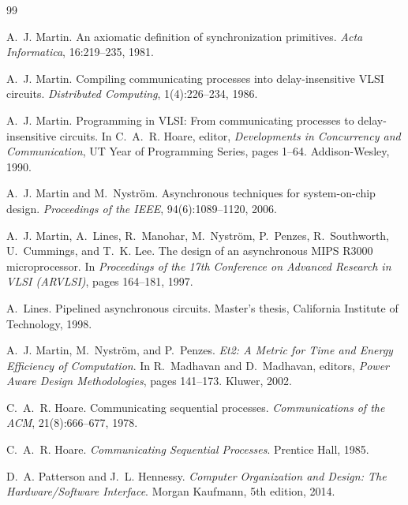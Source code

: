 \documentclass[11pt]{article}
\begin{document}
\begin{thebibliography}{99}

A.~J. Martin.
\newblock An axiomatic definition of synchronization primitives.
\newblock \emph{Acta Informatica}, 16:219--235, 1981.

A.~J. Martin.
\newblock Compiling communicating processes into delay-insensitive VLSI circuits.
\newblock \emph{Distributed Computing}, 1(4):226--234, 1986.

A.~J. Martin.
\newblock Programming in VLSI: From communicating processes to delay-insensitive
  circuits.
\newblock In C.~A.~R. Hoare, editor, \emph{Developments in Concurrency and
  Communication}, UT Year of Programming Series, pages 1--64. Addison-Wesley,
  1990.

A.~J. Martin and M.~Nystr\"om.
\newblock Asynchronous techniques for system-on-chip design.
\newblock \emph{Proceedings of the IEEE}, 94(6):1089--1120, 2006.

A.~J. Martin, A.~Lines, R.~Manohar, M.~Nystr\"om, P.~Penzes, R.~Southworth,
  U.~Cummings, and T.~K. Lee.
\newblock The design of an asynchronous MIPS R3000 microprocessor.
\newblock In \emph{Proceedings of the 17th Conference on Advanced Research in
  VLSI (ARVLSI)}, pages 164--181, 1997.

A.~Lines.
\newblock Pipelined asynchronous circuits.
\newblock Master's thesis, California Institute of Technology, 1998.

A.~J. Martin, M.~Nystr\"om, and P.~Penzes.
\newblock \emph{Et2: A Metric for Time and Energy Efficiency of Computation}.
\newblock In R.~Madhavan and D.~Madhavan, editors, \emph{Power Aware Design
  Methodologies}, pages 141--173. Kluwer, 2002.

C.~A.~R. Hoare.
\newblock Communicating sequential processes.
\newblock \emph{Communications of the ACM}, 21(8):666--677, 1978.

C.~A.~R. Hoare.
\newblock \emph{Communicating Sequential Processes}.
\newblock Prentice Hall, 1985.

D.~A. Patterson and J.~L. Hennessy.
\newblock \emph{Computer Organization and Design: The Hardware/Software
  Interface}.
\newblock Morgan Kaufmann, 5th edition, 2014.


\end{thebibliography}
\end{document}
